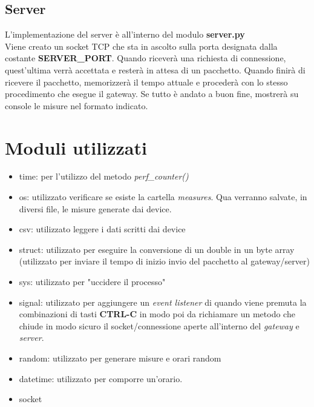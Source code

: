 \documentclass[a4paper, 14pt]{extreport}
\begin{document}
    \pagebreak

    \section{Server}
    L'implementazione del server è all'interno del modulo \textbf{server.py} \\
    Viene creato un socket TCP che sta in ascolto sulla porta designata dalla costante \textbf{SERVER\_PORT}.
    Quando riceverà una richiesta di connessione, quest'ultima verrà accettata e resterà in 
    attesa di un pacchetto. Quando finirà di ricevere il pacchetto, memorizzerà il tempo
    attuale e procederà con lo stesso procedimento che esegue il gateway.
    Se tutto è andato a buon fine, mostrerà su console le misure nel formato indicato.

    \pagebreak

    \chapter{Moduli utilizzati}
    \begin{itemize}
        \item time: per l'utilizzo del metodo \emph{perf\_counter()} 
        \item os: utilizzato verificare se esiste la cartella \emph{measures}. Qua verranno salvate, in diversi file, le misure
                    generate dai device. 
        \item csv: utilizzato leggere i dati scritti dai device
        \item struct: utilizzato per eseguire la conversione di un double in un byte array 
                    (utilizzato per inviare il tempo di inizio invio del pacchetto al gateway/server)
        \item sys: utilizzato per "uccidere il processo"
        \item signal: utilizzato per aggiungere un \emph{event listener} di quando viene premuta
                    la combinazioni di tasti \textbf{CTRL-C} in modo poi da richiamare un metodo
                    che chiude in modo sicuro il socket/connessione aperte all'interno del \emph{gateway} e 
                    \emph{server}.
        \item random: utilizzato per generare misure e orari random
        \item datetime: utilizzato per comporre un'orario.
        \item socket
    \end{itemize}
\end{document}

